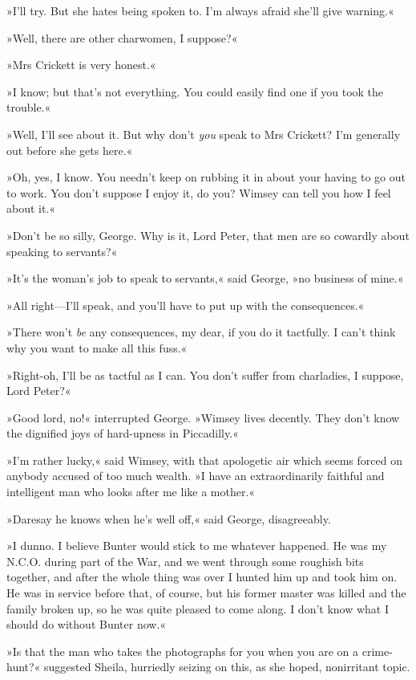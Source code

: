 »I'll try. But she hates being spoken to. I'm always afraid she'll give warning.«

»Well, there are other charwomen, I suppose?«

»Mrs Crickett is very honest.«

»I know; but that's not everything. You could easily find one if you took the trouble.«

»Well, I'll see about it. But why don't \textit{you} speak to Mrs Crickett? I'm generally out before she gets here.«

»Oh, yes, I know. You needn't keep on rubbing it in about your having to go out to work. You don't suppose I enjoy it, do you? Wimsey can tell you how I feel about it.«

»Don't be so silly, George. Why is it, Lord Peter, that men are so cowardly about speaking to servants?«

»It's the woman's job to speak to servants,« said George, »no business of mine.«

»All right—I'll speak, and you'll have to put up with the consequences.«

»There won't \textit{be} any consequences, my dear, if you do it tactfully. I can't think why you want to make all this fuss.«

»Right-oh, I'll be as tactful as I can. You don't suffer from charladies, I suppose, Lord Peter?«

»Good lord, no!« interrupted George. »Wimsey lives decently. They don't know the dignified joys of hard-upness in Piccadilly.«

»I'm rather lucky,« said Wimsey, with that apologetic air which seems forced on anybody accused of too much wealth. »I have an extraordinarily faithful and intelligent man who looks after me like a mother.«

»Daresay he knows when he's well off,« said George, disagreeably.

»I dunno. I believe Bunter would stick to me whatever happened. He was my N.C.O. during part of the War, and we went through some roughish bits together, and after the whole thing was over I hunted him up and took him on. He was in service before that, of course, but his former master was killed and the family broken up, so he was quite pleased to come along. I don't know what I should do without Bunter now.«

»Is that the man who takes the photographs for you when you are on a crime-hunt?« suggested Sheila, hurriedly seizing on this, as she hoped, nonirritant topic.


